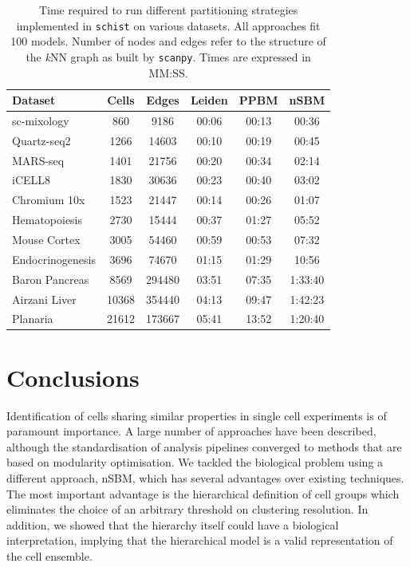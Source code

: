 \documentclass[10pt]{article}
\begin{document}
\begin{table}[h!]
\centering
 \begin{tabular}{|| l c c c c c ||}
 \hline
 \textbf{Dataset} & \textbf{Cells} & \textbf{Edges} & \textbf{Leiden} & \textbf{PPBM} & \textbf{nSBM} \\ [0.5ex] 
 \hline\hline
 sc-mixology \cite{Tian_2019} & 860 & 9186 & 00:06 & 00:13 & 00:36 \\ 
 \hline
 Quartz-seq2 \cite{mereu_2020} & 1266 & 14603 & 00:10 & 00:19 & 00:45 \\
 \hline
 MARS-seq \cite{mereu_2020} & 1401 & 21756 & 00:20 & 00:34 & 02:14 \\
 \hline
 iCELL8 \cite{mereu_2020} & 1830 & 30636 & 00:23 & 00:40 & 03:02 \\
 \hline
 Chromium 10x \cite{mereu_2020} & 1523 & 21447 & 00:14 & 00:26 & 01:07 \\ 
 \hline
 Hematopoiesis \cite{paul_2015} & 2730 & 15444 & 00:37 & 01:27 & 05:52\\ 
 \hline
 Mouse Cortex \cite{Zeisel_2015} & 3005 & 54460 & 00:59 & 00:53 & 07:32 \\
 \hline
 Endocrinogenesis \cite{Bastidas_Ponce_2019} & 3696 & 74670 & 01:15 & 01:29 & 10:56 \\
 \hline
 Baron Pancreas \cite{Baron_2016} & 8569 & 294480 & 03:51 & 07:35 & 1:33:40 \\
 \hline
 Airzani Liver \cite{Aizarani_2019} & 10368 & 354440 & 04:13 & 09:47 & 1:42:23 \\
 \hline
 Planaria \cite{plass_2018} & 21612 & 173667 & 05:41 & 13:52 & 1:20:40 \\
 \hline
\end{tabular}
\caption{Time required to run different partitioning strategies implemented in \texttt{schist} on various datasets. All approaches fit 100 models. Number of nodes and edges refer to the structure of the \emph{k}NN graph as built by \texttt{scanpy}. Times are expressed in MM:SS. }
\label{Table_runtime}
\end{table}

\section*{Conclusions}

Identification of cells sharing similar properties in single cell experiments is of paramount importance. A large number of approaches have been described, although the standardisation of analysis pipelines converged to methods that are based on modularity optimisation. We tackled the biological problem using a different approach, nSBM, which has several advantages over existing techniques. The most important advantage is the hierarchical definition of cell groups which eliminates the choice of an arbitrary threshold on clustering resolution. In addition, we showed that the hierarchy itself could have a biological interpretation, implying that the hierarchical model is a valid representation of the cell ensemble. 
\end{document}
